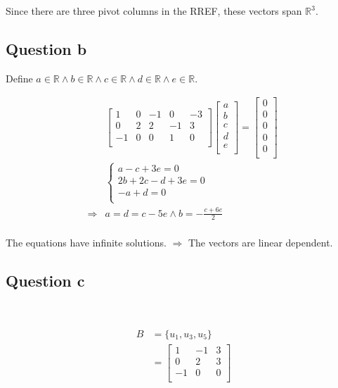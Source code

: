 \documentclass{article}
\def\R{\mathbb{R}}
\begin{document}
Since there are three pivot columns in the RREF, these vectors span $\R^3$.

\subsection{Question b}

Define $a\in\R\land b\in\R\land c\in\R\land d\in\R\land e\in\R$.

\begin{equation}
\tag{5.2}
\begin{split}
&\begin{bmatrix}
1&0&-1&0&-3\\
0&2&2&-1&3\\
-1&0&0&1&0\\
\end{bmatrix}
\begin{bmatrix}
a\\
b\\
c\\
d\\
e\\
\end{bmatrix}=
\begin{bmatrix}
0\\
0\\
0\\
0\\
0\\
\end{bmatrix}\\
&\begin{cases}
a-c+3e=0\\
2b+2c-d+3e=0\\
-a+d=0\\
\end{cases}\\
\Rightarrow &a=d=c-5e \land b=-\frac{c+6e}{2}\\
\end{split}
\end{equation}

The equations have infinite solutions.
$\Rightarrow$ The vectors are linear dependent.

\subsection{Question c}

~

\begin{equation}
\tag{5.3-1}\
\begin{split}
B &= \{u_1,u_3,u_5\}\\
&=\begin{bmatrix}
1&-1&3\\
0&2&3\\
-1&0&0\\
\end{bmatrix}\\
\end{split}
\end{equation}
\end{document}
